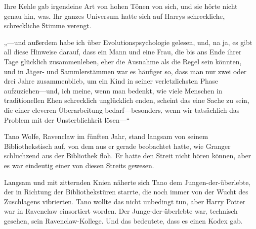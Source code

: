Ihre Kehle gab irgendeine Art von hohen Tönen von sich, und sie hörte nicht genau hin, was. Ihr ganzes Universum hatte sich auf Harrys schreckliche, schreckliche Stimme verengt.

„—und außerdem habe ich über Evolutionspsychologie gelesen, und, na ja, es gibt all diese Hinweise darauf, dass ein Mann und eine Frau, die bis ans Ende ihrer Tage glücklich zusammenleben, eher die Ausnahme als die Regel sein könnten, und in Jäger- und Sammlerstämmen war es häufiger so, dass man nur zwei oder drei Jahre zusammenblieb, um ein Kind in seiner verletzlichsten Phase aufzuziehen—und, ich meine, wenn man bedenkt, wie viele Menschen in traditionellen Ehen schrecklich unglücklich enden, scheint das eine Sache zu sein, die einer cleveren Überarbeitung bedarf—besonders, wenn wir tatsächlich das Problem mit der Unsterblichkeit lösen—“

\later

Tano Wolfe, Ravenclaw im fünften Jahr, stand langsam von seinem Bibliothekstisch auf, von dem aus er gerade beobachtet hatte, wie Granger schluchzend aus der Bibliothek floh. Er hatte den Streit nicht hören können, aber es war eindeutig einer von diesen Streits gewesen.


Langsam und mit zitternden Knien näherte sich Tano dem Jungen-der-überlebte, der in Richtung der Bibliothekstüren starrte, die noch immer von der Wucht des Zuschlagens vibrierten. Tano wollte das nicht unbedingt tun, aber Harry Potter war in Ravenclaw einsortiert worden. Der Junge-der-überlebte war, technisch gesehen, sein Ravenclaw-Kollege. Und das bedeutete, dass es einen Kodex gab.

